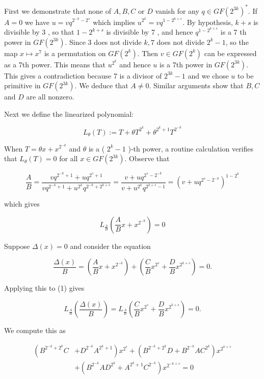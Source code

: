 \documentclass[10pt]{article}
\begin{document}
First we demonstrate that none of $A, B, C$ or $D$ vanish for any $q \in G F\left(2^{3 k}\right)^{*}$. If $A=0$ we have $u=v q^{2^{-k}-2^{s}}$ which implies $u^{2^{k}}=v q^{1-2^{k+s}}$. By hypothesis, $k+s$ is divisible by 3 , so that $1-2^{k+s}$ is divisible by 7 , and hence $q^{1-2^{k+s}}$ is a 7 th power in $G F\left(2^{3 k}\right)$. Since 3 does not divide $k, 7$ does not divide $2^{k}-1$, so the map $x \mapsto x^{7}$ is a permutation on $G F\left(2^{k}\right)$. Then $v \in G F\left(2^{k}\right)$ can be expressed as a 7th power. This means that $u^{2^{k}}$ and hence $u$ is a 7th power in $G F\left(2^{3 k}\right)$. This gives a contradiction because 7 is a divisor of $2^{3 k}-1$ and we chose $u$ to be primitive in $G F\left(2^{3 k}\right)$. We deduce that $A \neq 0$. Similar arguments show that $B, C$ and $D$ are all nonzero.

Next we define the linearized polynomial:

$$
L_{\theta}(T):=T+\theta T^{2^{k}}+\theta^{2^{k}+1} T^{2^{-k}}
$$

When $T=\theta x+x^{2^{-k}}$ and $\theta$ is a ( $2^{k}-1$ )-th power, a routine calculation verifies that $L_{\theta}(T)=0$ for all $x \in G F\left(2^{3 k}\right)$. Observe that

$$
\frac{A}{B}=\frac{v q^{2^{-k}+1}+u q^{2^{s}+1}}{v q^{2^{-k}+1}+u^{2^{k}} q^{2^{-k}+2^{k+s}}}=\frac{v+u q^{2^{s}-2^{-k}}}{v+u^{2^{k}} q^{2^{k+s}-1}}=\left(v+u q^{2^{s}-2^{-k}}\right)^{1-2^{k}}
$$

which gives


\begin{equation*}
L_{\frac{A}{B}}\left(\frac{A}{B} x+x^{2^{-k}}\right)=0 \tag{1}
\end{equation*}


Suppose $\Delta(x)=0$ and consider the equation

$$
\frac{\Delta(x)}{B}=\left(\frac{A}{B} x+x^{2^{-k}}\right)+\left(\frac{C}{B} x^{2^{s}}+\frac{D}{B} x^{2^{k+s}}\right)=0 .
$$

Applying this to (1) gives

$$
L_{\frac{A}{B}}\left(\frac{\Delta(x)}{B}\right)=L_{\frac{A}{B}}\left(\frac{C}{B} x^{2^{s}}+\frac{D}{B} x^{2^{k+s}}\right)=0 .
$$

We compute this as

$$
\begin{aligned}
\left(B^{2^{-k}+2^{k}} C\right. & \left.+D^{2^{-k}} A^{2^{k}+1}\right) x^{2^{s}}+\left(B^{2^{-k}+2^{k}} D+B^{2^{-k}} A C^{2^{k}}\right) x^{2^{k+s}} \\
& +\left(B^{2^{-k}} A D^{2^{k}}+A^{2^{k}+1} C^{2^{-k}}\right) x^{2^{-k+s}}=0
\end{aligned}
$$
\end{document}
